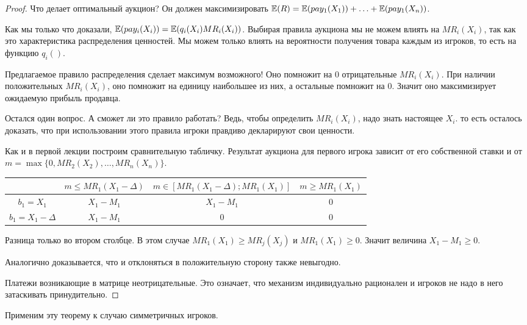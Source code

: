 \begin{proof}
Что делает оптимальный аукцион? Он должен максимизировать $ \mathbb{E}(R)=\mathbb{E}(pay_{1}(X_{1}))+\ldots+ \mathbb{E}(pay_{1}(X_{n}))$.

Как мы только что доказали, $\mathbb{E}(pay_{i}(X_{i}))=\mathbb{E}(q_{i}(X_{i})MR_{i}(X_{i}))$. Выбирая правила аукциона мы не можем влиять на $ MR_{i}(X_{i}) $, так как это характеристика распределения ценностей. Мы можем только влиять на вероятности получения товара каждым из игроков, то есть на функцию $ q_{i}() $.

Предлагаемое правило распределения сделает максимум возможного! Оно помножит на 0 отрицательные $ MR_{i}(X_{i}) $. При наличии положительных $ MR_{i}(X_{i}) $, оно помножит на единицу наибольшее из них, а остальные помножит на 0. Значит оно максимизирует ожидаемую прибыль продавца.

Остался один вопрос. А сможет ли это правило работать? Ведь, чтобы определить $ MR_{i}(X_{i}) $, надо знать настоящее $ X_{i} $. то есть осталось доказать, что при использовании этого правила игроки правдиво декларируют свои ценности.

Как и в первой лекции построим сравнительную табличку.  Результат аукциона для первого игрока зависит от его собственной ставки и от $ m=\max\{0,MR_{2}(X_{2}),\ldots,MR_{n}(X_{n})\} $.
\begin{tabular}{c|ccc}
& $ m\leq MR_{1}(X_{1}-\Delta) $ & $ m\in [MR_{1}(X_{1}-\Delta);MR_{1}(X_{1})] $ & $ m\geq MR_{1}(X_{1})$ \\
\hline
$ b_{1}=X_{1} $ & $ X_{1}-M_{1} $ & $ X_{1}-M_{1} $ &  0\\
$b_{1}=X_{1}-\Delta $ & $ X_{1}-M_{1} $ & 0 & 0 \\
\end{tabular}

Разница только во втором столбце. В этом случае $ MR_{1}(X_{1})\geq MR_{j}(X_{j}) $ и $ MR_{1}(X_{1})\geq 0 $. Значит величина $ X_{1}-M_{1}\geq 0 $.

Аналогично доказывается, что и отклоняться в положительную сторону также невыгодно.

Платежи возникающие в матрице неотрицательные. Это означает, что механизм индивидуально рационален и игроков не надо в него затаскивать принудительно.
\end{proof}

Применим эту теорему к случаю симметричных игроков.


